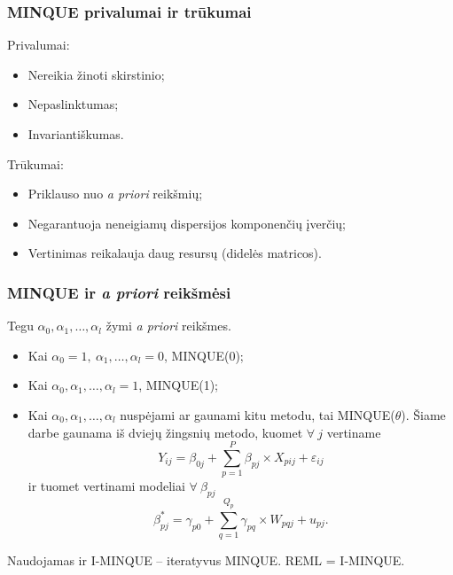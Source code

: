 \documentclass[utf8,hyperref={unicode,pdftex}]{beamer}
\begin{document}
\begin{frame}
\frametitle{MINQUE privalumai ir trūkumai}
Privalumai:
\begin{itemize}
\item Nereikia žinoti skirstinio;
\item Nepaslinktumas;
\item Invariantiškumas.
\end{itemize}
Trūkumai:
\begin{itemize}
\item Priklauso nuo \textit{a priori} reikšmių;
\item Negarantuoja neneigiamų dispersijos komponenčių įverčių;
\item Vertinimas reikalauja daug resursų (didelės matricos).
\end{itemize}
\end{frame}

\begin{frame}
\frametitle{MINQUE ir \textit{a priori} reikšmėsi}
Tegu $\alpha_0, \alpha_1,\dots,\alpha_l$ žymi \textit{a priori} reikšmes.
\begin{itemize}
\item Kai $\alpha_0=1,\ \alpha_1,\dots, \alpha_l=0$, MINQUE(0);
\item Kai $\alpha_0,\alpha_1,\dots, \alpha_l=1$, MINQUE(1);
\item Kai $\alpha_0, \alpha_1,\dots,\alpha_l$ nuspėjami ar gaunami kitu metodu, tai MINQUE($\theta$). Šiame darbe gaunama iš dviejų žingsnių metodo, kuomet $\forall \  j$ vertiname
\[
Y_{ij} = \beta_{0j}+\sum^P_{p = 1} \beta_{pj}\times X_{pij}+\varepsilon_{ij}
\]
ir tuomet vertinami modeliai $\forall \ \beta_{pj}$
\[\beta^*_{pj}= \gamma_{p0} + \sum^{Q_p}_{q=1}\gamma_{pq}\times W_{pqj}+u_{pj}.\]
\end{itemize}
Naudojamas ir I-MINQUE -- iteratyvus MINQUE. REML = I-MINQUE.
\end{frame}
\end{document}
